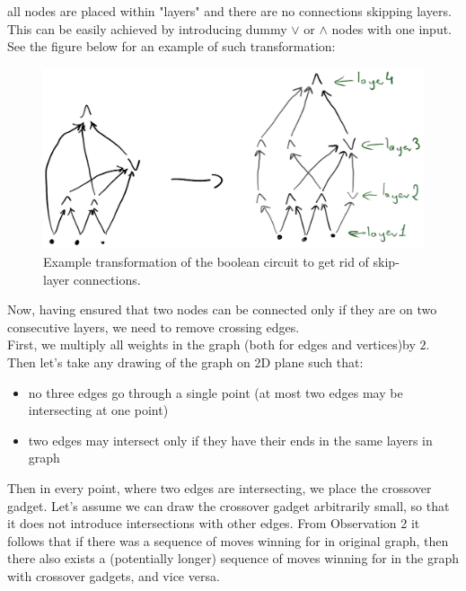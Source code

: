 all nodes are placed within "layers" and there are no connections skipping layers. This can be easily
achieved by introducing dummy $\lor$ or $\land$ nodes with one input. See the figure below for an
example of such transformation:
\begin{figure}[H]
      \centering
      \caption{Example transformation of the boolean circuit to get rid of skip-layer connections.}
      \includegraphics[scale=0.2]{content/graphics/game19.png}
\end{figure}
\noindent
Now, having ensured that two nodes can be connected only if they are on two consecutive layers, 
we need to remove crossing edges.\\
First, we multiply all weights in the graph (both for edges and vertices)by $2$.\\
Then let's take any drawing of the graph on 2D plane such that:
\begin{itemize}
      \item no three edges go through a single point (at most two edges may be intersecting at one point)
      \item two edges may intersect only if they have their ends in the same layers in graph
\end{itemize}
Then in every point, where two edges are intersecting, we place the crossover gadget. Let's assume
we can draw the crossover gadget arbitrarily small, so that it does not introduce intersections with
other edges. From Observation 2 it follows that if there was a sequence of moves winning for in
original graph, then there also exists a (potentially longer) sequence of moves winning for in the
graph with crossover gadgets, and vice versa.
